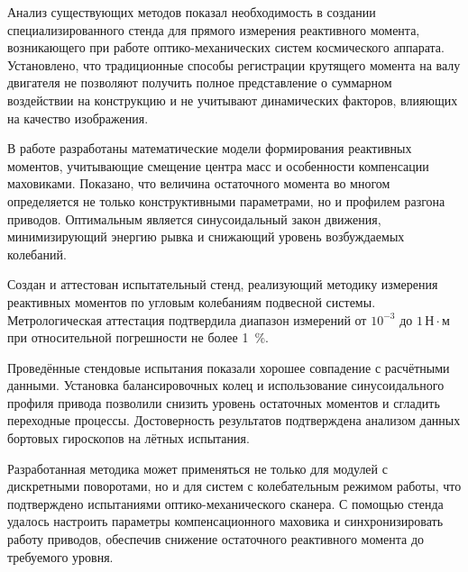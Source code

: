 

Анализ существующих методов показал необходимость в создании специализированного стенда для прямого измерения реактивного момента, возникающего при работе оптико-механических систем космического аппарата. Установлено, что традиционные способы регистрации крутящего момента на валу двигателя не позволяют получить полное представление о суммарном воздействии на конструкцию и не учитывают динамических факторов, влияющих на качество изображения.

В работе разработаны математические модели формирования реактивных моментов, учитывающие смещение центра масс и особенности компенсации маховиками. Показано, что величина остаточного момента во многом определяется не только конструктивными параметрами, но и профилем разгона приводов. Оптимальным является синусоидальный закон движения, минимизирующий энергию рывка и снижающий уровень возбуждаемых колебаний.

Создан и аттестован испытательный стенд, реализующий методику измерения реактивных моментов по угловым колебаниям подвесной системы. Метрологическая аттестация подтвердила диапазон измерений от $10^{-3}$ до $1\,\text{Н}\cdot\text{м}$ при относительной погрешности не более 1~\%.

Проведённые стендовые испытания показали хорошее совпадение с расчётными данными. Установка балансировочных колец и использование синусоидального профиля привода позволили снизить уровень остаточных моментов и сгладить переходные процессы. Достоверность результатов подтверждена анализом данных бортовых гироскопов на лётных испытания.

Разработанная методика может применяться не только для модулей с дискретными поворотами, но и для систем с колебательным режимом работы, что подтверждено испытаниями оптико-механического сканера. С помощью стенда удалось настроить параметры компенсационного маховика и синхронизировать работу приводов, обеспечив снижение остаточного реактивного момента до требуемого уровня.


